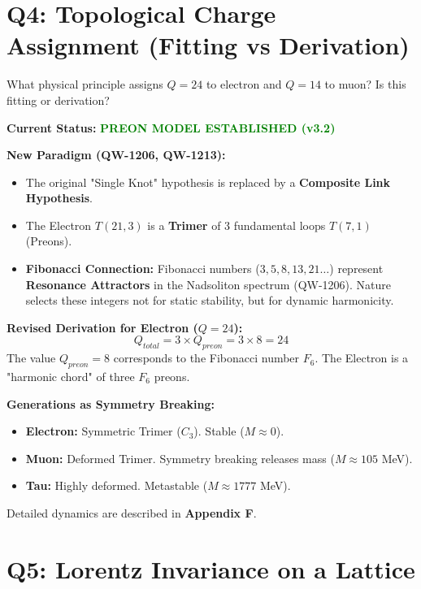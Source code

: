 \documentclass[11pt,a4paper]{book}
\theoremstyle{remark}
\begin{document}
\hrulefill

\section{Q4: Topological Charge Assignment (Fitting vs Derivation)}

\begin{question}
What physical principle assigns $Q=24$ to electron and $Q=14$ to muon? Is this fitting or derivation?
\end{question}

\textbf{Current Status:} \textcolor{green}{\textbf{PREON MODEL ESTABLISHED (v3.2)}}

\textbf{New Paradigm (QW-1206, QW-1213):}
\begin{itemize}
    \item The original "Single Knot" hypothesis is replaced by a \textbf{Composite Link Hypothesis}.
    \item The Electron $T(21,3)$ is a \textbf{Trimer} of 3 fundamental loops $T(7,1)$ (Preons).
    \item \textbf{Fibonacci Connection:} Fibonacci numbers ($3, 5, 8, 13, 21 \dots$) represent \textbf{Resonance Attractors} in the Nadsoliton spectrum (QW-1206). Nature selects these integers not for static stability, but for dynamic harmonicity.
\end{itemize}

\textbf{Revised Derivation for Electron ($Q = 24$):}
\begin{equation}
Q_{total} = 3 \times Q_{preon} = 3 \times 8 = 24
\end{equation}
The value $Q_{preon}=8$ corresponds to the Fibonacci number $F_6$. The Electron is a "harmonic chord" of three $F_6$ preons.

\textbf{Generations as Symmetry Breaking:}
\begin{itemize}
    \item \textbf{Electron:} Symmetric Trimer ($C_3$). Stable ($M \approx 0$).
    \item \textbf{Muon:} Deformed Trimer. Symmetry breaking releases mass ($M \approx 105$ MeV).
    \item \textbf{Tau:} Highly deformed. Metastable ($M \approx 1777$ MeV).
\end{itemize}
Detailed dynamics are described in \textbf{Appendix F}.
\hrulefill

\section{Q5: Lorentz Invariance on a Lattice}
\end{document}
